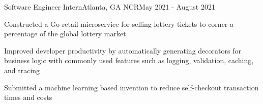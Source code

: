 \resumeSubheading
{Software Engineer Intern}{Atlanta, GA}
{NCR}{May 2021 - August 2021}
\resumeItemListStart

\resumeItem
{
  Constructed a Go retail microservice for selling lottery tickets to
  corner a percentage of the global lottery market
}

\resumeItem
{
  Improved developer productivity by automatically generating decorators
  for business logic with commonly used features such as logging, validation,
  caching, and tracing
}

\resumeItem
{
  Submitted a machine learning based invention to reduce self-checkout transaction times
  and costs
}



\resumeItemListEnd
